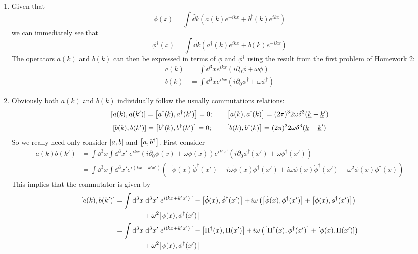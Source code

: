 \documentclass[12pt]{article}
\begin{document}
\begin{enumerate}[label=(\alph*)]
    \item Given that
    \[ \phi(x) = \int\tilde{\dd k}\left(a(k)e^{-ikx} + b^\dag(k)e^{ikx}\right) \]
    we can immediately see that
    \[ \phi^\dag(x) = \int\tilde{\dd k}\left(a^\dag(k)e^{ikx} + b(k)e^{-ikx}\right) \]
    The operators $a(k)$ and $b(k)$ can then be expressed in terms of $\phi$ and $\phi^\dag$ using the result from the first problem of Homework 2:
    \begin{align*}
        a(k) &= \int\dd^3x e^{ikx}\left(i\partial_0\phi + \omega\phi\right) \\
        b(k) &= \int\dd^3x e^{ikx}\left(i\partial_0\phi^\dag + \omega\phi^\dag\right)
    \end{align*}

    \item Obviously both $a(k)$ and $b(k)$ individually follow the usually commutations relations:
    \[ \comm{a(k)}{a(k')} = \comm{a^\dag(k)}{a^\dag(k')} = 0; \qquad \comm{a(k)}{a^\dag(k)} = (2\pi)^32\omega\delta^3(\underline{k}-\underline{k}') \]
    \[ \comm{b(k)}{b(k')} = \comm{b^\dag(k)}{b^\dag(k')} = 0; \qquad \comm{b(k)}{b^\dag(k)} = (2\pi)^32\omega\delta^3(\underline{k}-\underline{k}') \]
    So we really need only consider $\comm{a}{b}$ and $\comm{a}{b^\dag}$. First consider
    \begin{align*}
        a(k)b(k') &= \int\dd^3x\int\dd^3x' \; e^{ikx}\left(i\partial_0\phi(x) + \omega\phi(x)\right)e^{ik'x'}\left(i\partial_0\phi^\dag(x') + \omega\phi^\dag(x')\right) \\
        &= \int\dd^3x\int\dd^3x' e^{i(kx + k'x')}\left(-\dot{\phi}(x)\dot{\phi}^\dag(x') + i\omega\dot{\phi}(x)\phi^\dag(x') + i\omega\phi(x)\dot{\phi}^\dag(x') + \omega^2\phi(x)\phi^\dag(x)\right)
    \end{align*}
    This implies that the commutator is given by
    \begin{align*}
        \comm{a(k)}{b(k')} &= \int\dd^3x\;\dd^3x' \; e^{i(kx + k'x')}\big{[}-\comm{\dot{\phi}(x)}{\dot{\phi}^\dag(x')} + i\omega\left(\comm{\dot{\phi}(x)}{\phi^\dag(x')} + \comm{\phi(x)}{\dot{\phi}^\dag(x')}\right) \\
        &\qquad\qquad + \omega^2\comm{\phi(x)}{\phi^\dag(x')}\big{]} \\
        &= \int\dd^3x\;\dd^3x' \; e^{i(kx+k'x')}\big{[}-\comm{\Pi^\dag(x)}{\Pi(x')} + i\omega\left(\comm{\Pi^\dag(x)}{\phi^\dag(x')} + \comm{\phi(x)}{\Pi(x')}\right) \\
        &\qquad\qquad + \omega^2\comm{\phi(x)}{\phi^\dag(x')}\big{]}
    \end{align*}

\end{enumerate}
\end{document}
